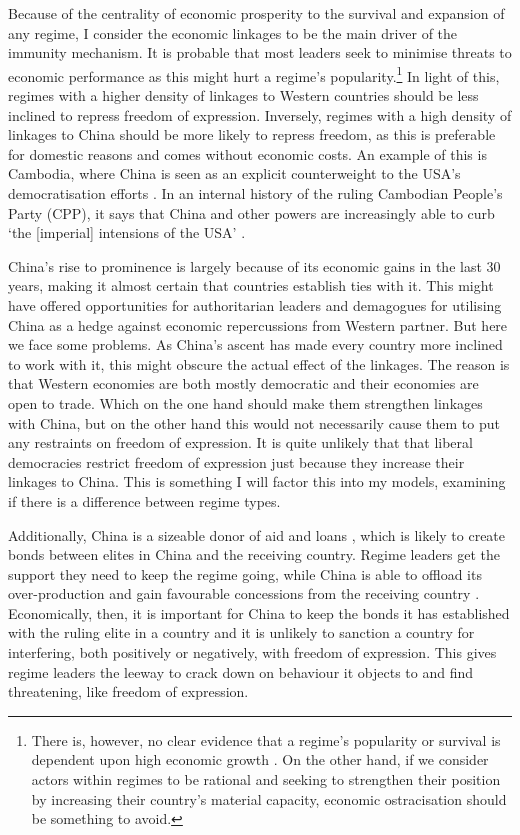 Because of the centrality of economic prosperity to the survival and expansion of any regime, I consider the economic linkages to be the main driver of the immunity mechanism. It is probable that most leaders seek to minimise threats to economic performance as this might hurt a regime's popularity.\footnote{There is, however, no clear evidence that a regime's popularity or survival is dependent upon high economic growth \citep{chu_sources_2013, stockemer_economic_2020}. On the other hand, if we consider actors within regimes to be rational and seeking to strengthen their position by increasing their country's material capacity, economic ostracisation should be something to avoid.} In light of this, regimes with a higher density of linkages to Western countries should be less inclined to repress freedom of expression. Inversely, regimes with a high density of linkages to China should be more likely to repress freedom, as this is preferable for domestic reasons and comes without economic costs. An example of this is Cambodia, where China is seen as an explicit counterweight to the USA's democratisation efforts \citep[pp. 7-8]{loughlin_chinese_2021}. In an internal history of the ruling Cambodian People's Party (CPP), it says that China and other powers are increasingly able to curb `the [imperial] intensions of the USA' \citep{loughlin_chinese_2021}.

China's rise to prominence is largely because of its economic gains in the last 30 years, making it almost certain that countries establish ties with it. This might have offered opportunities for authoritarian leaders and demagogues for utilising China as a hedge against economic repercussions from Western partner. But here we face some problems. As China's ascent has made every country more inclined to work with it, this might obscure the actual effect of the linkages. The reason is that Western economies are both mostly democratic and their economies are open to trade. Which on the one hand should make them strengthen linkages with China, but on the other hand this would not necessarily cause them to put any restraints on freedom of expression. It is quite unlikely that that liberal democracies restrict freedom of expression just because they increase their linkages to China. This is something I will factor this into my models, examining if there is a difference between regime types.

Additionally, China is a sizeable donor of aid and loans \citep{fuchs_why_2022}, which is likely to create bonds between elites in China and the receiving country. Regime leaders get the support they need to keep the regime going, while China is able to offload its over-production and gain favourable concessions from the receiving country \citep[p. 4]{fuchs_why_2022}. Economically, then, it is important for China to keep the bonds it has established with the ruling elite in a country and it is unlikely to sanction a country for interfering, both positively or negatively, with freedom of expression. This gives regime leaders the leeway to crack down on behaviour it objects to and find threatening, like freedom of expression.

